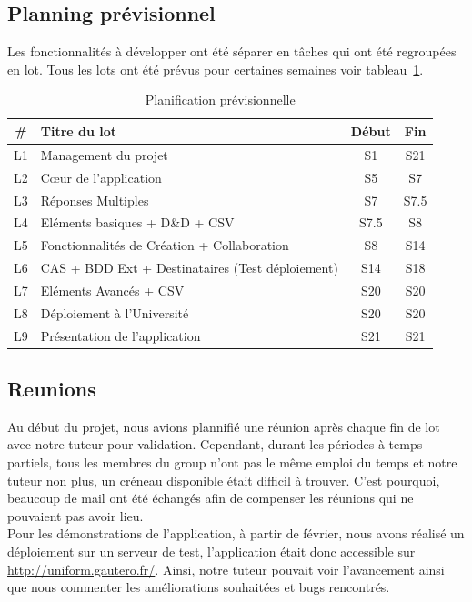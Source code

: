 \documentclass{sigplanconf}
\begin{document}
\subsection{Planning prévisionnel}
Les fonctionnalités à développer ont été séparer en tâches qui ont été regroupées en lot. Tous les lots ont été prévus pour certaines semaines voir tableau~\ref{planifPrev}.

\begin{table}
\begin{center}
\begin{tabular}{|c|p{5cm}|c|c|}
\hline
 \# & Titre du lot & Début & Fin \\ \hline
L1 & Management du projet & S1 & S21\tabularnewline
L2 & Cœur de l'application & S5 & S7\tabularnewline
L3 & Réponses Multiples & S7 & S7.5\tabularnewline
L4 & Eléments basiques + D\&D + CSV & S7.5 & S8\tabularnewline
L5 & Fonctionnalités de Création + Collaboration & S8 & S14\tabularnewline
L6 & CAS + BDD Ext + Destinataires (Test déploiement) & S14 & S18\tabularnewline
L7 & Eléments Avancés + CSV & S20 & S20\tabularnewline
L8 & Déploiement à l'Université & S20 & S20\tabularnewline
L9 & Présentation de l'application & S21 & S21\\
\hline
\end{tabular}
\end{center}
\caption{Planification prévisionnelle}\label{planifPrev}
\end{table}

\subsection{Reunions}
Au début du projet, nous avions plannifié une réunion après chaque fin de lot avec notre tuteur pour validation. Cependant, durant les périodes à temps partiels, tous les membres du group n'ont pas le même emploi du temps et notre tuteur non plus, un créneau disponible était difficil à trouver. C'est pourquoi, beaucoup de mail ont été échangés afin de compenser les réunions qui ne pouvaient pas avoir lieu.\\
Pour les démonstrations de l'application, à partir de février, nous avons réalisé un déploiement sur un serveur de test, l'application était donc accessible sur \url{http://uniform.gautero.fr/}. Ainsi, notre tuteur pouvait voir l'avancement ainsi que nous commenter les améliorations souhaitées et bugs rencontrés.
\end{document}

